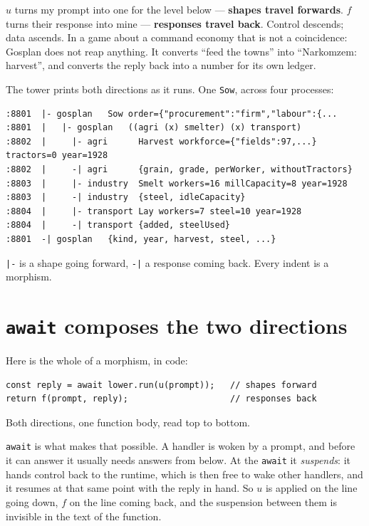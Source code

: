 \documentclass[11pt,a4paper]{article}
\begin{document}
\noindent $u$ turns my prompt into one for the level below --- \textbf{shapes
travel forwards}. $f$ turns their response into mine --- \textbf{responses travel
back}. Control descends; data ascends. In a game about a command economy that
is not a coincidence: Gosplan does not reap anything. It converts ``feed the
towns'' into ``Narkomzem: harvest'', and converts the reply back into a number
for its own ledger.

The tower prints both directions as it runs. One \texttt{Sow}, across four
processes:

\begin{lstlisting}
:8801  |- gosplan   Sow order={"procurement":"firm","labour":{...
:8801  |   |- gosplan   ((agri (x) smelter) (x) transport)
:8802  |     |- agri      Harvest workforce={"fields":97,...} tractors=0 year=1928
:8802  |     -| agri      {grain, grade, perWorker, withoutTractors}
:8803  |     |- industry  Smelt workers=16 millCapacity=8 year=1928
:8803  |     -| industry  {steel, idleCapacity}
:8804  |     |- transport Lay workers=7 steel=10 year=1928
:8804  |     -| transport {added, steelUsed}
:8801  -| gosplan   {kind, year, harvest, steel, ...}
\end{lstlisting}

\noindent \verb#|-# is a shape going forward, \verb#-|# a response coming back.
Every indent is a morphism.

\section{\texttt{await} composes the two directions}

Here is the whole of a morphism, in code:

\begin{lstlisting}
const reply = await lower.run(u(prompt));   // shapes forward
return f(prompt, reply);                    // responses back
\end{lstlisting}

\noindent Both directions, one function body, read top to bottom.

\texttt{await} is what makes that possible. A handler is woken by a prompt, and
before it can answer it usually needs answers from below. At the \texttt{await}
it \emph{suspends}: it hands control back to the runtime, which is then free to
wake other handlers, and it resumes at that same point with the reply in hand.
So $u$ is applied on the line going down, $f$ on the line coming back, and the
suspension between them is invisible in the text of the function.
\end{document}
